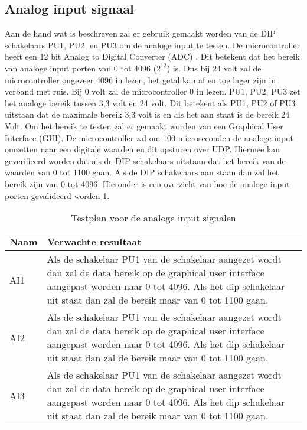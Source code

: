\subsection{Analog input signaal}
Aan de hand wat is beschreven zal er gebruik gemaakt worden van de DIP schakelaars PU1, PU2, en PU3 om de analoge input te testen. De microcontroller heeft een 12 bit Analog to Digital Converter (ADC) \autocite{microcontroller}. Dit betekent dat het bereik van analoge input porten van 0 tot 4096 ($2^{12}$) is. Dus bij 24 volt zal de microcontroller ongeveer 4096 in lezen, het getal kan af en toe lager zijn in verband met ruis. Bij 0 volt zal de microcontroller 0 in lezen. PU1, PU2, PU3 zet het analoge bereik tussen 3,3 volt en 24 volt. Dit betekent als PU1, PU2 of PU3 uitstaan dat de maximale bereik 3,3 volt is en als het aan staat is de bereik 24 Volt. Om het bereik te testen zal er  gemaakt worden van een Graphical User Interface (GUI). De microcontroller zal om 100 microseconden de analoge input omzetten naar een digitale waarden en dit opsturen over UDP. Hiermee kan geverifieerd worden dat als de DIP schakelaars uitstaan dat het bereik van de waarden van 0 tot 1100 gaan. Als de DIP schakelaars aan staan dan zal het bereik zijn van 0 tot 4096. Hieronder is een overzicht van hoe de analoge input porten gevalideerd worden \ref{tab:hw_val_ai_testplan}.
\begin{table}[h!]
	\caption{Testplan voor de analoge input signalen}
	\begin{tabular}{lp{14.5cm}}
	\toprule
	\textbf{Naam} 	& \textbf{Verwachte resultaat} \\ \toprule
	AI1			& Als de schakelaar PU1 van de schakelaar aangezet wordt dan zal de data bereik op de graphical user interface aangepast worden naar 0 tot 4096. Als het dip schakelaar uit staat dan zal de bereik maar van 0 tot 1100 gaan.\\
	AI2			& Als de schakelaar PU1 van de schakelaar aangezet wordt dan zal de data bereik op de graphical user interface aangepast worden naar 0 tot 4096. Als het dip schakelaar uit staat dan zal de bereik maar van 0 tot 1100 gaan.\\
	AI3			& Als de schakelaar PU1 van de schakelaar aangezet wordt dan zal de data bereik op de graphical user interface aangepast worden naar 0 tot 4096. Als het dip schakelaar uit staat dan zal de bereik maar van 0 tot 1100 gaan.\\  \bottomrule
	\end{tabular}
	\label{tab:hw_val_ai_testplan}
\end{table}

